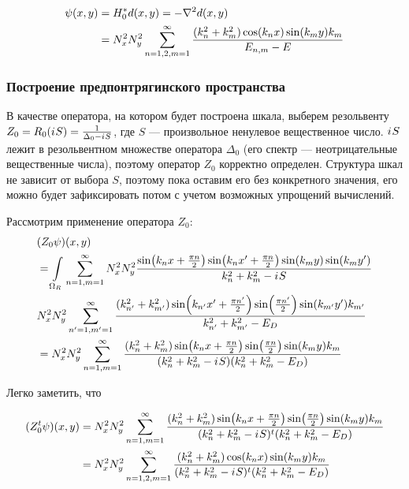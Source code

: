 \begin{align*}
\psi(x, y)
& = H_0^* d(x, y) = - \laplacian d(x, y) \\
& = N_x^2 N_y^2 \sum\limits_{n = 1,2, m = 1}^\infty \frac{(k_n^2 + k_m^2) \cos(k_n x) \sin(k_m y) k_m}{E_{n, m} - E}
\end{align*}

\subsubsection{Построение предпонтрягинского пространства}
В качестве оператора, на котором будет построена шкала, выберем резольвенту $Z_0 = R_0({i\mkern1mu} S) = \frac{1}{\Delta_0 - {i\mkern1mu} S}$, где $S$ — произвольное ненулевое вещественное число. ${i\mkern1mu} S$ лежит в резольвентном множестве оператора $\Delta_0$ (его спектр — неотрицательные вещественные числа), поэтому оператор $Z_0$ корректно определен. Структура шкал не зависит от выбора $S$, поэтому пока оставим его без конкретного значения, его можно будет зафиксировать потом с учетом возможных упрощений вычислений.

Рассмотрим применение оператора $Z_0$:
\begin{align*}
& (Z_0 \psi)(x, y) \\
&= \int\limits_{\Omega_R} \sum\limits_{n = 1, m = 1}^\infty N_x^2 N_y^2 \frac{\sin(k_n x + \frac{\pi n}{2}) \sin(k_n x' + \frac{\pi n}{2}) \sin(k_m y) \sin(k_m y')}{k^2_n + k^2_m - {i\mkern1mu} S} \\
& N_x^2 N_y^2 \sum\limits_{n' = 1, m' = 1}^\infty \frac{(k_{n'}^2 + k_{m'}^2) \sin(k_{n'} x' + \frac{\pi n'}{2}) \sin(\frac{\pi n'}{2}) \sin(k_{m'} y') k_{m'}}{k_{n'}^2 + k_{m'}^2 - E_D} \\
&= N_x^2 N_y^2 \sum\limits_{n = 1, m = 1}^\infty \frac{(k_n^2 + k_m^2) \sin(k_n x + \frac{\pi n}{2}) \sin(\frac{\pi n}{2}) \sin(k_m y) k_m}{(k_n^2 + k_m^2 - {i\mkern1mu} S) (k_n^2 + k_m^2 - E_D)}
\end{align*}

Легко заметить, что 

\begin{align*}
(Z_0^t \psi)(x, y)
&= N_x^2 N_y^2 \sum\limits_{n = 1, m = 1}^\infty \frac{(k_n^2 + k_m^2) \sin(k_n x + \frac{\pi n}{2}) \sin(\frac{\pi n}{2}) \sin(k_m y) k_m}{(k_n^2 + k_m^2 - {i\mkern1mu} S)^t (k_n^2 + k_m^2 - E_D)} \\
&= N_x^2 N_y^2 \sum\limits_{n = 1,2, m = 1}^\infty \frac{(k_n^2 + k_m^2) \cos(k_n x) \sin(k_m y) k_m}{(k_n^2 + k_m^2 - {i\mkern1mu} S)^t (k_n^2 + k_m^2 - E_D)}
\end{align*}


